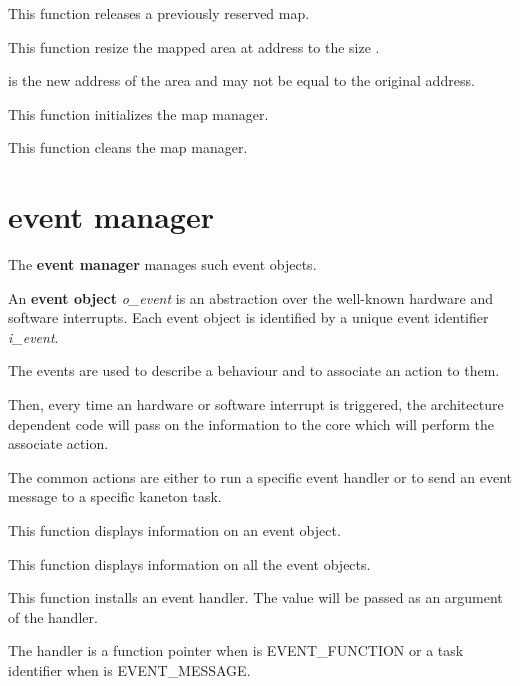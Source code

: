 	 {
	   This function releases a previously reserved map.
	 }

	 {
	   This function resize the mapped area at address 
	   to the size .

	    is the new address of the area and may not be
	   equal to the original address.

	 }

	 {
	   This function initializes the map manager.
	 }

	 {
	   This function cleans the map manager.
	 }

%
%

\section{event manager}

The \textbf{event manager} manages such event objects.

An \textbf{event object} \textit{o\_event} is an abstraction over the
well-known hardware and software interrupts. Each event object is
identified by a unique event identifier \textit{i\_event}.

The events are used to describe a behaviour and to associate an action
to them.

Then, every time an hardware or software interrupt is triggered, the
architecture dependent code will pass on the information to the core
which will perform the associate action.

The common actions are either to run a specific event handler or to
send an event message to a specific kaneton task.

%
%

	 {
	   This function displays information on an event object.
	 }

	 {
	   This function displays information on all the event objects.
	 }

	 {
	   This function installs an event handler. The 
	   value will be passed as an argument of the handler.

	   The handler  is a function pointer when
	    is EVENT\_FUNCTION or a task identifier when
	    is EVENT\_MESSAGE.
	 }

